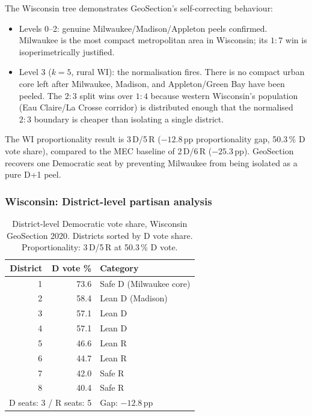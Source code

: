 The Wisconsin tree demonstrates GeoSection's self-correcting behaviour:
\begin{itemize}
\item Levels 0--2: genuine Milwaukee/Madison/Appleton peels confirmed.
  Milwaukee is the most compact metropolitan area in Wisconsin; its
  $1:7$ win is isoperimetrically justified.
\item Level 3 ($k=5$, rural WI): the normalisation fires.
  There is no compact urban core left after Milwaukee, Madison, and
  Appleton/Green Bay have been peeled.
  The $2:3$ split wins over $1:4$ because western Wisconsin's population
  (Eau Claire/La Crosse corridor) is distributed enough that the
  normalised $2:3$ boundary is cheaper than isolating a single district.
\end{itemize}

The WI proportionality result is 3\,D/5\,R ($-12.8$\,pp proportionality gap,
50.3\,\% D vote share), compared to the MEC baseline of 2\,D/6\,R ($-25.3$\,pp).
GeoSection recovers one Democratic seat by preventing Milwaukee from being
isolated as a pure D+1 peel.

\subsubsection*{Wisconsin: District-level partisan analysis}

\begin{table}[h]
\centering
\caption{District-level Democratic vote share, Wisconsin GeoSection 2020.
  Districts sorted by D vote share. Proportionality: 3\,D/5\,R at 50.3\,\% D vote.}
\label{tab:wi-partisan}
\begin{tabular}{rrl}
\toprule
District & D vote \% & Category \\
\midrule
1 & 73.6 & Safe D (Milwaukee core) \\
2 & 58.4 & Lean D (Madison) \\
3 & 57.1 & Lean D \\
4 & 57.1 & Lean D \\
5 & 46.6 & Lean R \\
6 & 44.7 & Lean R \\
7 & 42.0 & Safe R \\
8 & 40.4 & Safe R \\
\midrule
\multicolumn{2}{l}{D seats: 3 / R seats: 5} & Gap: $-12.8$\,pp \\
\bottomrule
\end{tabular}
\end{table}

